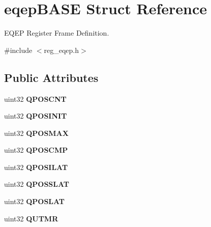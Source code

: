 \hypertarget{structeqepBASE}{}\section{eqep\+B\+A\+SE Struct Reference}
\label{structeqepBASE}


E\+Q\+EP Register Frame Definition.  




{\ttfamily \#include $<$reg\+\_\+eqep.\+h$>$}

\subsection*{Public Attributes}
\begin{DoxyCompactItemize}
\item 
\mbox{\label{structeqepBASE_a7b2a5c0cf0acd6e372e765eccf877ba9}} 
uint32 {\bfseries Q\+P\+O\+S\+C\+NT}
\item 
\mbox{\label{structeqepBASE_a9e98df7b80a782898a7ec759f37b95ed}} 
uint32 {\bfseries Q\+P\+O\+S\+I\+N\+IT}
\item 
\mbox{\label{structeqepBASE_a2d743ac93c45fa3de3db1ee37fde6d3d}} 
uint32 {\bfseries Q\+P\+O\+S\+M\+AX}
\item 
\mbox{\label{structeqepBASE_a301d425cc290fd306f082f8f2928b65f}} 
uint32 {\bfseries Q\+P\+O\+S\+C\+MP}
\item 
\mbox{\label{structeqepBASE_a6cd29cd0c132d06cf7031ffe93076741}} 
uint32 {\bfseries Q\+P\+O\+S\+I\+L\+AT}
\item 
\mbox{\label{structeqepBASE_aca3d28c268d103a4c90cf7ac8895e87a}} 
uint32 {\bfseries Q\+P\+O\+S\+S\+L\+AT}
\item 
\mbox{\label{structeqepBASE_a64eb949a1bc301802d8c626d111b22be}} 
uint32 {\bfseries Q\+P\+O\+S\+L\+AT}
\item 
\mbox{\label{structeqepBASE_aac702367facbebf448b0451013a41648}} 
uint32 {\bfseries Q\+U\+T\+MR}
\item 
\mbox{\label{structeqepBASE_a6a026cbab0e6ceeaf50236698484f6e2}} 

\end{DoxyCompactItemize}
